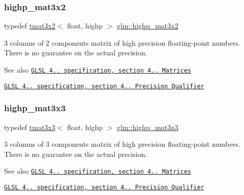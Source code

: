 \subsubsection{\texorpdfstring{highp\+\_\+mat3x2}{highp\_mat3x2}}
{\footnotesize\ttfamily typedef \hyperlink{structglm_1_1tmat3x2}{tmat3x2}$<$ float, highp $>$ \hyperlink{group__core__precision_ga5df0f5c4120d0fd47825506c86b7814c}{glm\+::highp\+\_\+mat3x2}}

3 columns of 2 components matrix of high precision floating-\/point numbers. There is no guarantee on the actual precision.

\begin{DoxySeeAlso}{See also}
\href{http://www.opengl.org/registry/doc/GLSLangSpec.4.20.8.pdf}{\tt G\+L\+SL 4.. specification, section 4.. Matrices} 

\href{http://www.opengl.org/registry/doc/GLSLangSpec.4.20.8.pdf}{\tt G\+L\+SL 4.. specification, section 4.. Precision Qualifier} 
\end{DoxySeeAlso}
\mbox{\label{group__core__precision_gac4db2c4ff089b960ddd5682abaa9e5d4}} 
\subsubsection{\texorpdfstring{highp\+\_\+mat3x3}{highp\_mat3x3}}
{\footnotesize\ttfamily typedef \hyperlink{structglm_1_1tmat3x3}{tmat3x3}$<$ float, highp $>$ \hyperlink{group__core__precision_gac4db2c4ff089b960ddd5682abaa9e5d4}{glm\+::highp\+\_\+mat3x3}}

3 columns of 3 components matrix of high precision floating-\/point numbers. There is no guarantee on the actual precision.

\begin{DoxySeeAlso}{See also}
\href{http://www.opengl.org/registry/doc/GLSLangSpec.4.20.8.pdf}{\tt G\+L\+SL 4.. specification, section 4.. Matrices} 

\href{http://www.opengl.org/registry/doc/GLSLangSpec.4.20.8.pdf}{\tt G\+L\+SL 4.. specification, section 4.. Precision Qualifier} 
\end{DoxySeeAlso}
\mbox{\label{group__core__precision_gab51b3b8377cf9462a39a1560333a4215}} 
